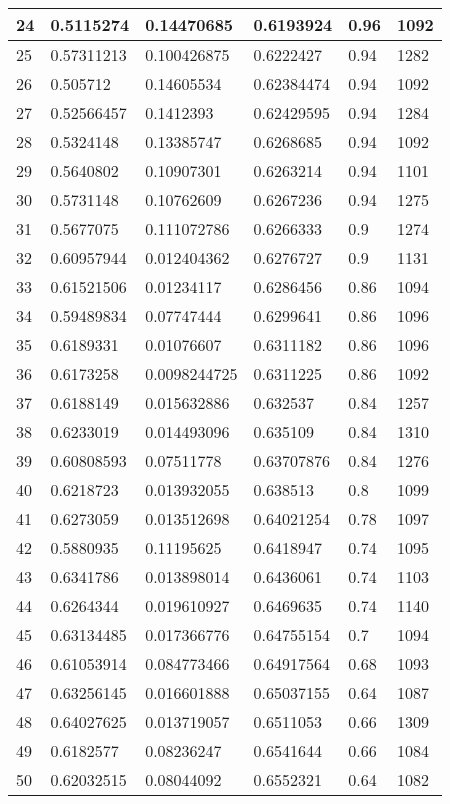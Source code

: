 \begin{longtable}{|l|l|l|l|l|l|}
24 & 0.5115274 & 0.14470685 & 0.6193924 & 0.96 & 1092 \\ \hline 
25 & 0.57311213 & 0.100426875 & 0.6222427 & 0.94 & 1282 \\ \hline 
26 & 0.505712 & 0.14605534 & 0.62384474 & 0.94 & 1092 \\ \hline 
27 & 0.52566457 & 0.1412393 & 0.62429595 & 0.94 & 1284 \\ \hline 
28 & 0.5324148 & 0.13385747 & 0.6268685 & 0.94 & 1092 \\ \hline 
29 & 0.5640802 & 0.10907301 & 0.6263214 & 0.94 & 1101 \\ \hline 
30 & 0.5731148 & 0.10762609 & 0.6267236 & 0.94 & 1275 \\ \hline 
31 & 0.5677075 & 0.111072786 & 0.6266333 & 0.9 & 1274 \\ \hline 
32 & 0.60957944 & 0.012404362 & 0.6276727 & 0.9 & 1131 \\ \hline 
33 & 0.61521506 & 0.01234117 & 0.6286456 & 0.86 & 1094 \\ \hline 
34 & 0.59489834 & 0.07747444 & 0.6299641 & 0.86 & 1096 \\ \hline 
35 & 0.6189331 & 0.01076607 & 0.6311182 & 0.86 & 1096 \\ \hline 
36 & 0.6173258 & 0.0098244725 & 0.6311225 & 0.86 & 1092 \\ \hline 
37 & 0.6188149 & 0.015632886 & 0.632537 & 0.84 & 1257 \\ \hline 
38 & 0.6233019 & 0.014493096 & 0.635109 & 0.84 & 1310 \\ \hline 
39 & 0.60808593 & 0.07511778 & 0.63707876 & 0.84 & 1276 \\ \hline 
40 & 0.6218723 & 0.013932055 & 0.638513 & 0.8 & 1099 \\ \hline 
41 & 0.6273059 & 0.013512698 & 0.64021254 & 0.78 & 1097 \\ \hline 
42 & 0.5880935 & 0.11195625 & 0.6418947 & 0.74 & 1095 \\ \hline 
43 & 0.6341786 & 0.013898014 & 0.6436061 & 0.74 & 1103 \\ \hline 
44 & 0.6264344 & 0.019610927 & 0.6469635 & 0.74 & 1140 \\ \hline 
45 & 0.63134485 & 0.017366776 & 0.64755154 & 0.7 & 1094 \\ \hline 
46 & 0.61053914 & 0.084773466 & 0.64917564 & 0.68 & 1093 \\ \hline 
47 & 0.63256145 & 0.016601888 & 0.65037155 & 0.64 & 1087 \\ \hline 
48 & 0.64027625 & 0.013719057 & 0.6511053 & 0.66 & 1309 \\ \hline 
49 & 0.6182577 & 0.08236247 & 0.6541644 & 0.66 & 1084 \\ \hline 
50 & 0.62032515 & 0.08044092 & 0.6552321 & 0.64 & 1082 \\ \hline 
\end{longtable}